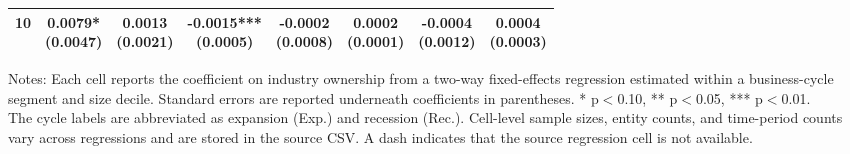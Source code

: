 \begin{table}[!htbp]
\begin{threeparttable}
\begin{tabular}{@{}lccccccc@{}}
10 & \shortstack{0.0079*\\(0.0047)} & \shortstack{0.0013\\(0.0021)} & \shortstack{-0.0015***\\(0.0005)} & \shortstack{-0.0002\\(0.0008)} & \shortstack{0.0002\\(0.0001)} & \shortstack{-0.0004\\(0.0012)} & \shortstack{0.0004\\(0.0003)} \\
\bottomrule
\end{tabular}
\vspace{0.35em}
\noindent\parbox{\textwidth}{\footnotesize
Notes: Each cell reports the coefficient on industry ownership from a two-way fixed-effects regression estimated within a business-cycle segment and size decile. Standard errors are reported underneath coefficients in parentheses. * p$<$0.10, ** p$<$0.05, *** p$<$0.01.\\
The cycle labels are abbreviated as expansion (Exp.) and recession (Rec.). Cell-level sample sizes, entity counts, and time-period counts vary across regressions and are stored in the source CSV. A dash indicates that the source regression cell is not available.
}
\end{threeparttable}
\end{table}
